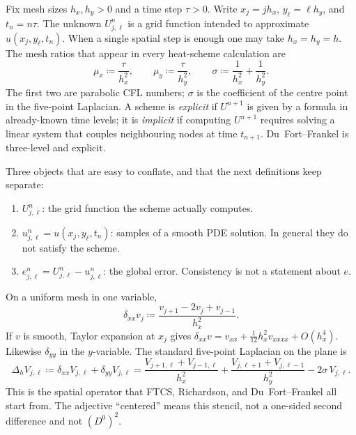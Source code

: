 \begin{notation}
\label{not:grid-p4}
Fix mesh sizes \(h_x,h_y>0\) and a time step \(\tau>0\). Write \(x_j=jh_x\), \(y_\ell=\ell h_y\), and \(t_n=n\tau\). The unknown \(U_{j,\ell}^n\) is a grid function intended to approximate \(u(x_j,y_\ell,t_n)\). When a single spatial step is enough one may take \(h_x=h_y=h\). The mesh ratios that appear in every heat-scheme calculation are
\[
\mu_x
\coloneqq
\frac{\tau}{h_x^2},
\qquad
\mu_y
\coloneqq
\frac{\tau}{h_y^2},
\qquad
\sigma
\coloneqq
\frac{1}{h_x^2}+\frac{1}{h_y^2}.
\]
The first two are parabolic CFL numbers; \(\sigma\) is the coefficient of the centre point in the five-point Laplacian. A scheme is \emph{explicit} if \(U^{n+1}\) is given by a formula in already-known time levels; it is \emph{implicit} if computing \(U^{n+1}\) requires solving a linear system that couples neighbouring nodes at time \(t_{n+1}\). Du~Fort--Frankel is three-level and explicit.
\end{notation}

Three objects that are easy to conflate, and that the next definitions keep separate:
\begin{enumerate}[label=\textup{(\roman*)}]
    \item \(U_{j,\ell}^n\): the grid function the scheme actually computes.
    \item \(u_{j,\ell}^n=u(x_j,y_\ell,t_n)\): samples of a smooth PDE solution. In general they do not satisfy the scheme.
    \item \(e_{j,\ell}^n=U_{j,\ell}^n-u_{j,\ell}^n\): the global error. Consistency is not a statement about \(e\).
\end{enumerate}

\begin{definition}
\label{def:five-point}
On a uniform mesh in one variable,
\[
\delta_{xx}v_j
\coloneqq
\frac{v_{j+1}-2v_j+v_{j-1}}{h_x^2}.
\]
If \(v\) is smooth, Taylor expansion at \(x_j\) gives \(\delta_{xx}v=v_{xx}+\frac{1}{12}h_x^2 v_{xxxx}+O(h_x^4)\). Likewise \(\delta_{yy}\) in the \(y\)-variable. The standard five-point Laplacian on the plane is
\[
\Delta_h V_{j,\ell}
\coloneqq
\delta_{xx}V_{j,\ell}+\delta_{yy}V_{j,\ell}
=
\frac{V_{j+1,\ell}+V_{j-1,\ell}}{h_x^2}
+
\frac{V_{j,\ell+1}+V_{j,\ell-1}}{h_y^2}
-
2\sigma\, V_{j,\ell}.
\]
This is the spatial operator that FTCS, Richardson, and Du~Fort--Frankel all start from. The adjective ``centered'' means this stencil, not a one-sided second difference and not \((D^0)^2\).
\end{definition}

